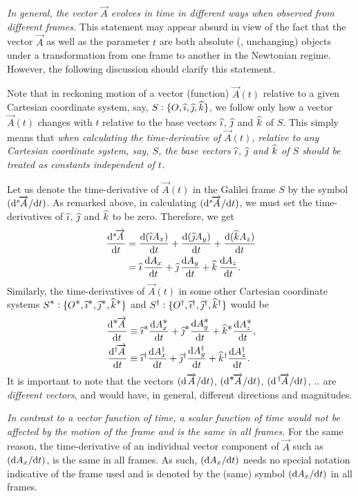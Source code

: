 \textsl{In general, the vector $\vec{A}$ evolves in time in 
different ways  when observed from different frames.} This 
statement may appear absurd in view of the fact that the 
vector $\vec{A}$ as well as the parameter $t$ are both 
absolute (\ie, unchanging) objects under a transformation 
from one frame to another in the Newtonian  regime. However, 
the following discussion should clarify this statement.

Note that in reckoning motion of a vector (function) 
$\vec{A}(t)$ relative to a given Cartesian coordinate 
system, say, $S : \{O,\eye,\jay,\kay\}$, we follow only how 
a vector $\vec{A}(t)$ changes with $t$ relative to the base 
vectors $\eye$, $\jay$ and $\kay$ of $S$. This simply means 
that \textsl{when calculating the time-derivative of  
$\vec{A}(t)$, relative to any Cartesian coordinate system, 
say, $S$, the base vectors $\eye$, $\jay$ and $\kay$ of $S$ 
should be treated as constants independent of $t$.}

Let us denote the time-derivative of $\vec{A}(t)$ in the 
Galilei frame $S$ by the symbol $\lds{s}{\vec{A}}{t}$. As 
remarked above, in calculating $\lds{s}{\vec{A}}{t}$, we 
must set the time-derivatives  of $\eye$, 
$\jay$ and $\kay$ to be zero. Therefore, we get
\begin{align}\label{nif.1}
\ldv{s}{\vec{A}}{t}&=\dv{(\eye A_x)}{t}+\dv{(\jay 
A_y)}{t}+\dv{(\kay 
A_z)}{t}\notag\\&=\eye\,\dv{A_x}{t}+\jay\,
\dv{A_y}{t}+\kay\,\dv{A_z}{t}.
\end{align}
Similarly, the time-derivatives of $\vec{A}(t)$ in some 
other Cartesian coordinate systems $S^\bst : \{O^{\bst}, 
\eye^{\bst},\jay^{\bst}, \kay^{\bst}\}$ and $ S^{\dagger} 
:\{O^{\dagger}, \eye^{\dagger}, \jay^{\dagger}, 
\kay^{\dagger}\} $ would be
\begin{align}\label{nif.1a}
\ldv{\bst}{\vec{A}}{t}& \equiv
\eye^{\bst}\dv{A^{\bst}_x}{t}
+\jay^{\bst}\dv{A^{\bst}_y}{t}
+\kay^{\bst } \dv{A^{\bst}_z}{ t}, \\
\ldv{\dagger}{\vec{A}}{t}& \equiv
\eye^{\dagger}\dv{A^{\dagger}_x}{t}
+\jay^{\dagger}\dv{A^{ \dagger}_y}{t}
+\kay^{\dagger} \dv{A^{\dagger}_z}{t}. \label{nif.1b}
\end{align}
It is important to note that the vectors 
$\lds{\,}{\vec{A}}{t}$, $\lds{\bst}{\vec{A}}{t}$,\break 
$\lds{\,\dagger}{\vec{A}} {t}$, $\dt$ are \textsl{different 
vectors}, and would have, in general, different directions 
and magnitudes.

\textsl{In contrast to a vector function of time, a scalar 
function of time would not be affected by the motion of the 
frame and is the same in all frames.} For the same reason, 
the time-derivative of an individual vector component of 
$\vec{A}$ such as $\sdv{A_x}{t}$, is the same in all frames. 
As such, $\sdv{A_x}{t}$ needs no special notation indicative 
of the frame used and is denoted by the (same) 
symbol $\sdv{A_x}{t}$ in all frames. 

